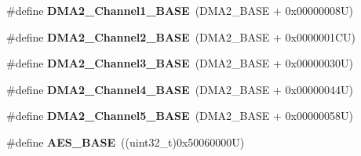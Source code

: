 \begin{DoxyCompactItemize}
\item 
\hypertarget{group___peripheral__memory__map_gad3bd6c4201d12f5d474518c1b02f8e3b}{\#define {\bfseries D\-M\-A2\-\_\-\-Channel1\-\_\-\-B\-A\-S\-E}~(D\-M\-A2\-\_\-\-B\-A\-S\-E + 0x00000008\-U)}\label{group___peripheral__memory__map_gad3bd6c4201d12f5d474518c1b02f8e3b}

\item 
\hypertarget{group___peripheral__memory__map_ga22f39f23c879c699b88e04a629f69d1c}{\#define {\bfseries D\-M\-A2\-\_\-\-Channel2\-\_\-\-B\-A\-S\-E}~(D\-M\-A2\-\_\-\-B\-A\-S\-E + 0x0000001\-C\-U)}\label{group___peripheral__memory__map_ga22f39f23c879c699b88e04a629f69d1c}

\item 
\hypertarget{group___peripheral__memory__map_ga6f2369b8bc155fb55a28891987605c2c}{\#define {\bfseries D\-M\-A2\-\_\-\-Channel3\-\_\-\-B\-A\-S\-E}~(D\-M\-A2\-\_\-\-B\-A\-S\-E + 0x00000030\-U)}\label{group___peripheral__memory__map_ga6f2369b8bc155fb55a28891987605c2c}

\item 
\hypertarget{group___peripheral__memory__map_ga01b063266473f290a55047654fbbfbee}{\#define {\bfseries D\-M\-A2\-\_\-\-Channel4\-\_\-\-B\-A\-S\-E}~(D\-M\-A2\-\_\-\-B\-A\-S\-E + 0x00000044\-U)}\label{group___peripheral__memory__map_ga01b063266473f290a55047654fbbfbee}

\item 
\hypertarget{group___peripheral__memory__map_ga1eea983a5d68bf36f4d19fbb07955ca1}{\#define {\bfseries D\-M\-A2\-\_\-\-Channel5\-\_\-\-B\-A\-S\-E}~(D\-M\-A2\-\_\-\-B\-A\-S\-E + 0x00000058\-U)}\label{group___peripheral__memory__map_ga1eea983a5d68bf36f4d19fbb07955ca1}

\item 
\hypertarget{group___peripheral__memory__map_gad099ae8679538f6c00294639d67528bf}{\#define {\bfseries A\-E\-S\-\_\-\-B\-A\-S\-E}~((uint32\-\_\-t)0x50060000\-U)}\label{group___peripheral__memory__map_gad099ae8679538f6c00294639d67528bf}


\end{DoxyCompactItemize}
